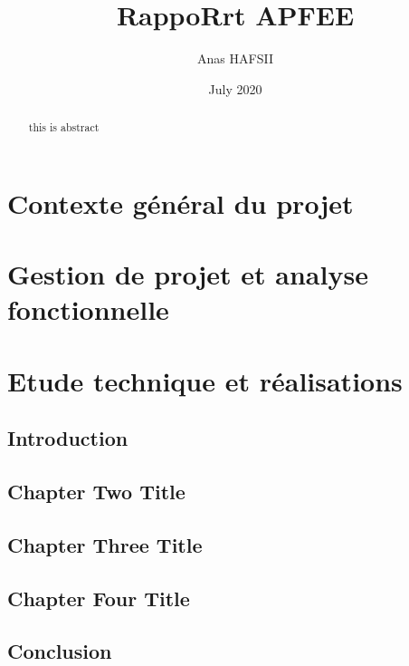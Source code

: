 \documentclass[a4paper, french, 12pt]{report}
\begin{document}
\title{RappoRrt APFEE}
\author{Anas HAFSII}
\date{July 2020}
\maketitle

\renewcommand{\abstractname}{Résumé}
\begin{abstract}
  
\end{abstract}

\renewcommand{\abstractname}{Abstract}
\begin{abstract}
  this is abstract
\end{abstract}

\tableofcontents
\part{Contexte général du projet}
\part{Gestion de projet et analyse fonctionnelle}
\part{Etude technique et réalisations}

\chapter{Introduction}


\chapter{Chapter Two Title}


\chapter{Chapter Three Title}


\chapter{Chapter Four Title}


\chapter{Conclusion}

\end{document}
